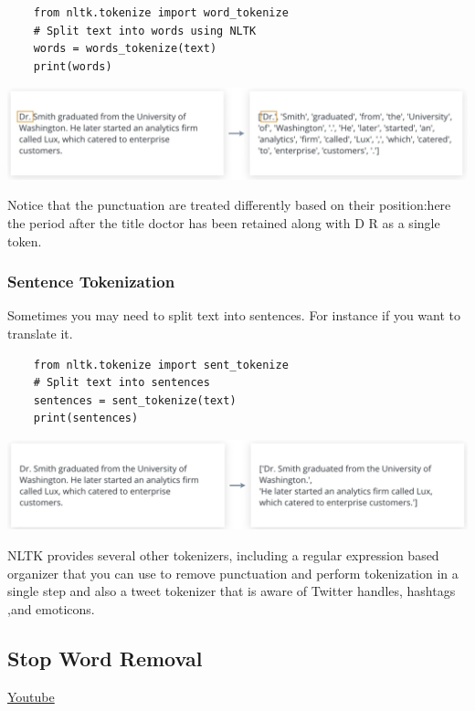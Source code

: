\begin{lstlisting}
    from nltk.tokenize import word_tokenize
    # Split text into words using NLTK
    words = words_tokenize(text)
    print(words)
\end{lstlisting}

\includegraphics[width=1\linewidth]{img//rnn//intro/word_tokenization.png}

Notice that the punctuation are treated differently based on their position:here the period after the title doctor has been retained along with D R as a single token. 

\subsubsection{Sentence Tokenization}
Sometimes you may need to split text into sentences. For instance if you want to translate it.

\begin{lstlisting}
    from nltk.tokenize import sent_tokenize
    # Split text into sentences
    sentences = sent_tokenize(text)
    print(sentences)
\end{lstlisting}

\includegraphics[width=1\linewidth]{img//rnn//intro/sentence_tokenization.png}

NLTK provides several other tokenizers, including a regular expression based organizer that you can use to remove punctuation and perform tokenization in a single step and also a tweet tokenizer that is aware of Twitter handles, hashtags ,and emoticons.

\subsection{Stop Word Removal}
\href{https://www.youtube.com/watch?v=WAU_Ij0GJbw&t=3s&ab_channel=Udacity}{Youtube}\newline

